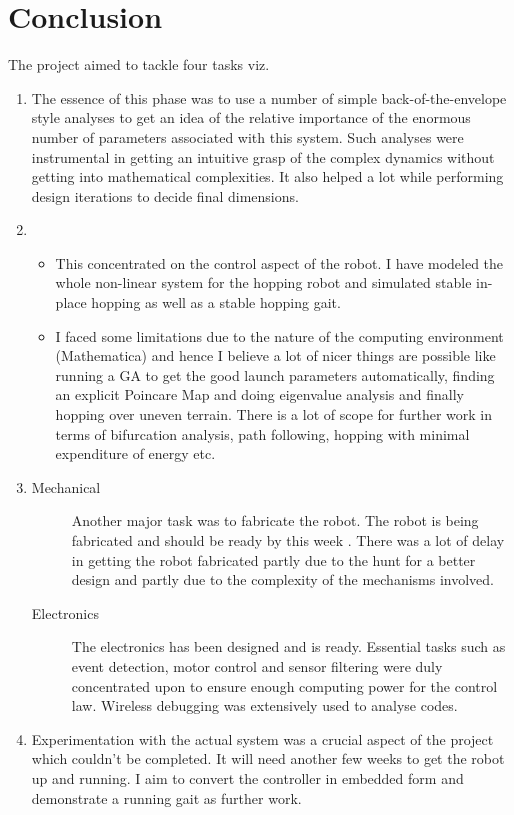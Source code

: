 \chapter{Conclusion}
\label{chap:conclude}

The project aimed to tackle four tasks viz.
\begin{enumerate}
  \item
  The essence of this phase was 
  to use a number of simple back-of-the-envelope style analyses to get an idea of the relative importance 
  of the enormous number of parameters associated with this system. Such analyses were instrumental in 
  getting an intuitive grasp of the complex dynamics without getting into mathematical complexities. It also helped a lot while performing design iterations to decide final dimensions.
  \item
  \begin{itemize}
   \item 
    This concentrated on the control aspect of the robot. I have modeled the 
    whole non-linear system for the hopping robot and simulated stable in-place hopping as well as a stable 
    hopping gait.
    \item
    I faced some limitations due to the nature of the computing environment (Mathematica) and hence I believe a lot of nicer things are possible like running a GA to get the good launch parameters automatically, finding an explicit Poincare Map and doing eigenvalue analysis and finally hopping over uneven terrain. There is a lot of scope for further work in terms of bifurcation analysis, path following, hopping with minimal expenditure of energy etc.
  \end{itemize}

  \item
  \begin{description}
   \item[\textsf{Mechanical}] 
    Another major task was to fabricate the robot. The robot is being fabricated and should be ready by this week . There was a lot of delay in getting the robot fabricated partly due to the hunt for a better design and partly due to the complexity of the mechanisms involved.
    \item[\textsf{Electronics}]
    The electronics has been designed and is ready. Essential tasks such as event detection, motor control and sensor filtering were duly concentrated upon to ensure enough computing power for the control law. Wireless debugging was extensively used to analyse codes.
  \end{description}
  \item
  Experimentation with the actual system was a crucial aspect of the project which couldn't be completed. 
  It will need another few weeks to get the robot up and running. I aim to convert the controller in 
  embedded form and demonstrate a running gait as further work.
\end{enumerate}
